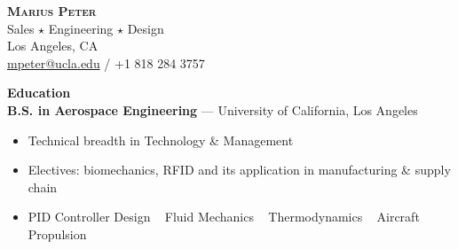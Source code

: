 \documentclass[10pt]{article}
\newcommand{\cvsec}[1]{{\Large\makebox[3cm][l]{\rule{3cm}{0.4pt}} \textbf{#1} \hrulefill\\[6pt]}}
\newcommand{\cventry}[3]{{\large\makebox[3cm][r]{#1~~~~} \textbf{#2}} --- #3\\}
\begin{document}
\begin{center}
  \huge \textbf{\textsc{Marius Peter}}\\[0.2cm]
  \Large Sales $\star$ Engineering $\star$ Design\\[0.2cm]
  \normalsize
  Los Angeles, CA\\
  \href{mailto:mpeter@ucla.edu}{mpeter@ucla.edu} / +1 818 284 3757\\
\end{center}


\vfill
\cvsec{Education}
\cventry{2014--2019}{B.S. in Aerospace Engineering}{University of California, Los Angeles}
\begin{itemize}
\item Technical breadth in Technology \& Management
\item Electives: biomechanics, RFID and its application in manufacturing \& supply chain
\item PID Controller Design \textbullet~
  Fluid Mechanics \textbullet~
  Thermodynamics \textbullet~
  Aircraft Propulsion \textbullet~
\end{itemize}
\end{document}
